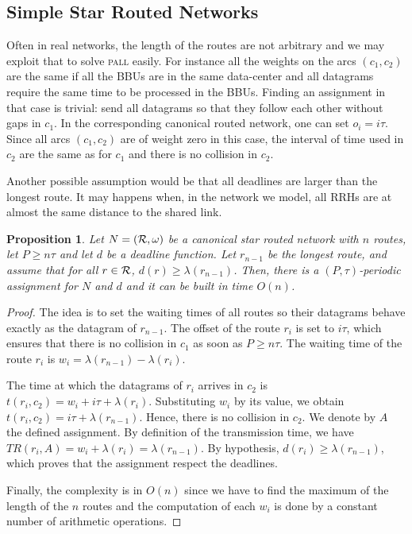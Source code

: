 \documentclass[a4paper,10pt]{journal}
\newtheorem{proposition}{Proposition}
\newcommand\pall{\textsc{pall}\xspace}
\begin{document}
	\subsection{Simple Star Routed Networks}
		

	Often in real networks, the length of the routes are not arbitrary and we may exploit that to solve \pall easily. For instance all the weights on the arcs $(c_1,c_2)$ are the same if all the BBUs are in the same data-center and all datagrams require the same time to be processed in the BBUs.
Finding an assignment in that case is trivial: send all datagrams so that they follow each other without gaps in $c_1$. In the corresponding canonical routed network, one can set $o_i = i\tau$.  Since all arcs $(c_1,c_2)$ are of weight zero in this case, the interval of time used in $c_2$ are the same as for $c_1$ and there is no collision in $c_2$.

	Another possible assumption would be that all deadlines are larger than the longest route. It may happens when, in the network we model, all RRHs are at almost the same distance to the shared link.

	 \begin{proposition}\label{prop:asym}
	Let $N = ({\cal R}, \omega)$ be a canonical star routed network with $n$ routes, let $P \geq n\tau$ and let $d$ be a deadline function. Let $r_{n-1}$ be the longest route, and assume that for all $r\in {\cal R}$, $d(r) \geq \lambda(r_{n-1})$. Then, there is a $(P,\tau)$-periodic assignment for $N$ and $d$ and it can be built in time $O(n)$.
	 \end{proposition}
      \begin{proof}
       The idea is to set the waiting times of all routes so their datagrams behave exactly as the datagram of $r_{n-1}$. The offset of the route $r_i$ is set to $i\tau$, which ensures that there is no collision in $c_1$ as soon as $P \geq n\tau$. The waiting time of the route $r_i$ is $w_i = \lambda(r_{n-1}) - \lambda(r_{i})$.
        
    The time at which the datagrams of $r_i$ arrives in $c_2$ is $t(r_i, c_2) = w_i + i\tau + \lambda(r_{i})$. Substituting $w_i$ by its value, we obtain $t(r_i, c_2) =  i\tau + \lambda(r_{n-1})$.
    Hence, there is no collision in $c_2$. We denote by $A$ the defined assignment. By definition of the transmission time, we have $TR(r_i,A) = w_i + \lambda(r_i) = \lambda(r_{n-1})$. By hypothesis, $d(r_i) \geq \lambda(r_{n-1})$, which proves that the assignment respect the deadlines.

	Finally, the complexity is in $O(n)$ since we have to find the maximum of the length of the $n$ routes and the computation of each $w_i$ is done by a constant number of arithmetic operations.
     \end{proof}
     
\end{document}
